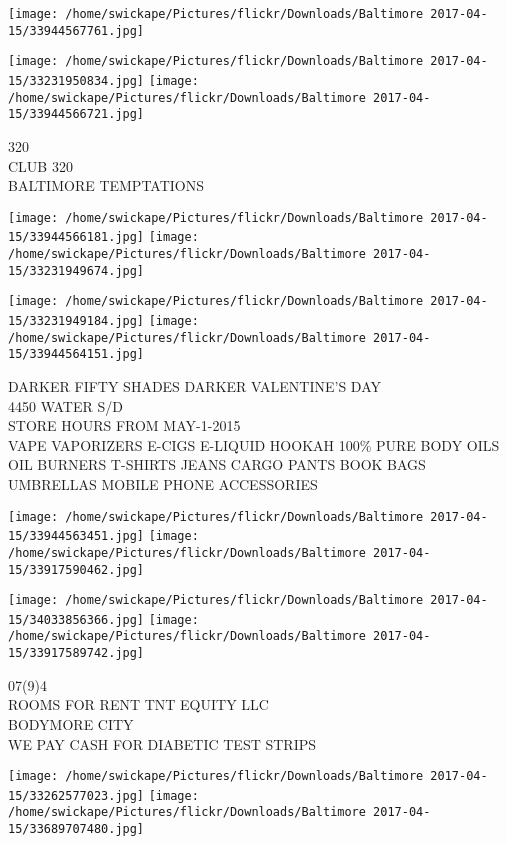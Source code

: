 \documentclass[10pt,letterpaper]{article}
\begin{document}
\texttt{[image: /home/swickape/Pictures/flickr/Downloads/Baltimore 2017-04-15/33944567761.jpg]}

\vspace{0.25in}
\texttt{[image: /home/swickape/Pictures/flickr/Downloads/Baltimore 2017-04-15/33231950834.jpg]}
\texttt{[image: /home/swickape/Pictures/flickr/Downloads/Baltimore 2017-04-15/33944566721.jpg]}

320\\
CLUB 320\\
BALTIMORE TEMPTATIONS
\pagebreak

\texttt{[image: /home/swickape/Pictures/flickr/Downloads/Baltimore 2017-04-15/33944566181.jpg]}
\texttt{[image: /home/swickape/Pictures/flickr/Downloads/Baltimore 2017-04-15/33231949674.jpg]}

\texttt{[image: /home/swickape/Pictures/flickr/Downloads/Baltimore 2017-04-15/33231949184.jpg]}
\texttt{[image: /home/swickape/Pictures/flickr/Downloads/Baltimore 2017-04-15/33944564151.jpg]}

DARKER FIFTY SHADES DARKER VALENTINE'S DAY\\
4450 WATER S/D\\
STORE HOURS FROM MAY{-}1{-}2015\\
VAPE VAPORIZERS E{-}CIGS E{-}LIQUID HOOKAH 100\% PURE BODY OILS OIL BURNERS T{-}SHIRTS JEANS CARGO PANTS BOOK BAGS UMBRELLAS MOBILE PHONE ACCESSORIES
\pagebreak

\texttt{[image: /home/swickape/Pictures/flickr/Downloads/Baltimore 2017-04-15/33944563451.jpg]}
\texttt{[image: /home/swickape/Pictures/flickr/Downloads/Baltimore 2017-04-15/33917590462.jpg]}

\texttt{[image: /home/swickape/Pictures/flickr/Downloads/Baltimore 2017-04-15/34033856366.jpg]}
\texttt{[image: /home/swickape/Pictures/flickr/Downloads/Baltimore 2017-04-15/33917589742.jpg]}

07(9)4\\
ROOMS FOR RENT TNT EQUITY LLC\\
BODYMORE CITY\\
WE PAY CASH FOR DIABETIC TEST STRIPS
\pagebreak

\texttt{[image: /home/swickape/Pictures/flickr/Downloads/Baltimore 2017-04-15/33262577023.jpg]}
\texttt{[image: /home/swickape/Pictures/flickr/Downloads/Baltimore 2017-04-15/33689707480.jpg]}
\end{document}
